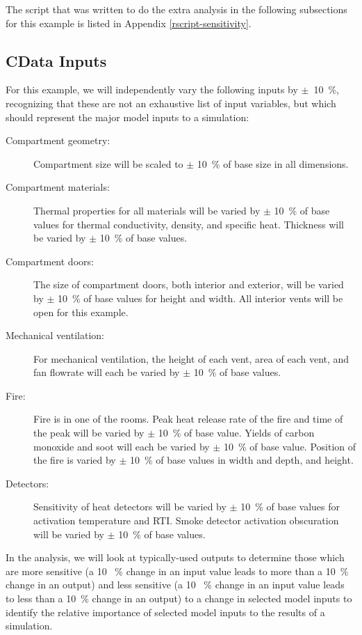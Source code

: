 \documentclass[12pt,twoside]{book}
\begin{document}
The script that was written to do the extra analysis in the following subsections for this example is listed in Appendix \ref{rscript-sensitivity}.

\subsection{CData Inputs}
For this example, we will independently vary the following inputs by $\pm$~10~\%, recognizing that these are not an exhaustive list of input variables, but which should represent the major model inputs to a simulation:

\begin{description}
\item[Compartment geometry:] Compartment size will be scaled to $\pm$ 10~\% of base size in all dimensions.
\item[Compartment materials:] Thermal properties for all materials will be varied by $\pm$ 10~\% of base values for thermal conductivity, density, and specific heat. Thickness will be  varied by $\pm$ 10~\% of base values.
\item[Compartment doors:] The size of compartment doors, both interior and exterior, will be  varied by $\pm$ 10~\% of base values for height and width. All interior vents will be open for this example.
\item[Mechanical ventilation:] For mechanical ventilation, the height of each vent, area of each vent, and fan flowrate will each be varied by $\pm$ 10~\% of base values.
\item[Fire:] Fire is in one of the rooms. Peak heat release rate of the fire and time of the peak will be varied by $\pm$ 10~\% of base value. Yields of carbon monoxide and soot will each be varied by $\pm$ 10~\% of base value. Position of the fire is varied by $\pm$ 10~\% of base values in width and depth, and height.
\item[Detectors:] Sensitivity of heat detectors will be varied by $\pm$ 10~\% of base values for activation temperature and RTI. Smoke detector activation obscuration will be varied by $\pm$ 10~\% of base values.
\end{description}

In the analysis, we will look at typically-used outputs to determine those which are more sensitive (a 10 ~\% change in an input value leads to more than a 10~\% change in an output) and less sensitive (a 10 ~\% change in an input value leads to less than a 10~\% change in an output) to a change in selected model inputs to identify the relative importance of selected model inputs to the results of a simulation.
\end{document}

